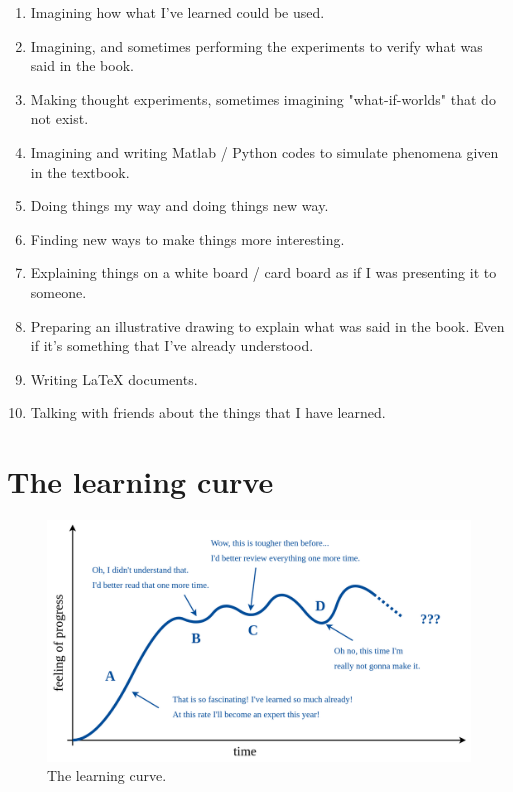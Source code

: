\documentclass[12pt]{report}
\begin{document}
\begin{enumerate}

\item Imagining how what I've learned could be used.

\item Imagining, and sometimes performing the experiments to verify what was said in the book.

\item Making thought experiments, sometimes imagining "what-if-worlds" that do not exist.

\item Imagining and writing Matlab / Python codes to simulate phenomena given in the textbook.

\item Doing things my way and doing things new way. 

\item Finding new ways to make things more interesting.

\item Explaining things on a white board / card board as if I was presenting it to someone.

\item Preparing an illustrative drawing to explain what was said in the book. Even if it's something that I've already understood.

\item Writing LaTeX documents.

\item Talking with friends about the things that I have learned. 

\end{enumerate}



\section{The learning curve} \label{chap:learning_curve}

\begin{figure}[H]
\centering\includegraphics[width=14.5cm]{learning_curve}
\caption{The learning curve.}			
\label{fig:learning_curve}
\end{figure}
\end{document}
